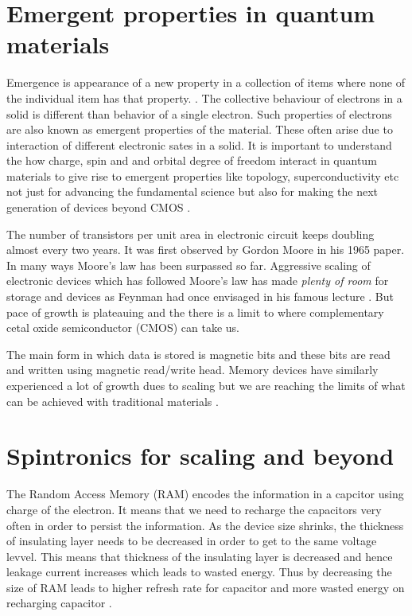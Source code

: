 \label{Introduction}


\section{Emergent properties in quantum materials}
Emergence is appearance of a new property in a collection of items where none of 
the individual item has that property. \cite{Anderson1972}.
The collective behaviour of electrons in a solid is different than behavior of a single electron. 
Such properties of electrons are also known as emergent properties of the material. These often arise due to interaction of different 
electronic sates in a solid. It is important to understand the how charge, spin and and orbital degree
of freedom interact in quantum materials to give rise to emergent properties like topology,
superconductivity etc not just for advancing the fundamental science but also for making the
next generation of devices beyond CMOS \cite{TokuaraEmergent}.

The number of transistors per unit area in electronic circuit keeps doubling almost every two years. 
It was first observed by Gordon Moore in his 1965 paper. In many ways Moore's law has been surpassed 
so far. Aggressive scaling of electronic devices which has followed Moore's law has made \emph{plenty of room}
for storage and devices as Feynman had once envisaged in his famous lecture \cite{feynman1960engineering}. But pace of growth is plateauing 
and the there is a limit to where complementary cetal oxide semiconductor (CMOS) can take us. 

The main form in which data is stored is magnetic bits and these bits are read and written using
magnetic read/write head. Memory devices have similarly experienced a lot of growth dues to 
scaling but we are reaching the limits of what can be achieved with traditional materials \cite{Bader2010}.


\section{Spintronics for scaling and beyond}
The Random Access Memory (RAM) encodes the information in a capcitor using charge 
of the electron. It means that we need to recharge the capacitors very often in order 
to persist the information. As the device size shrinks, the  thickness of insulating layer
needs to be decreased in order to get to the same voltage levvel. This means that thickness of 
the insulating layer is decreased and hence leakage current increases which leads to wasted energy.
Thus by decreasing the size of RAM leads to higher refresh rate for capacitor and more wasted energy
on recharging capacitor \cite{Jacob2008}.

